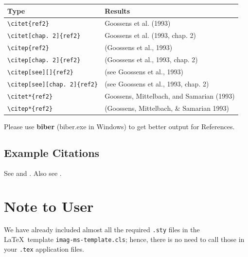 \documentclass[]{imag-ms-template}
\begin{document}
\noindent\begin{tabular}{@{}ll}
\bf Type&\bf Results\\
\midrule
\verb+\citet{ref2}+&Goossens et al. (1993)\\
\verb+\citet[chap. 2]{ref2}+&Goossens et al. (1993, chap. 2)\\
    \verb+\citep{ref2}+	    &   	(Goossens et al., 1993)\\
    \verb+\citep[chap. 2]{ref2}+ 	&    	(Goossens et al., 1993, chap. 2)\\
    \verb+\citep[see][]{ref2}+ 	 &    	(see Goossens et al., 1993)\\
    \verb+\citep[see][chap. 2]{ref2}+ 	&    	(see Goossens et al., 1993, chap. 2)\\
    \verb+\citet*{ref2}+ 	    &    	Goossens, Mittelbach, and Samarian (1993)\\
    \verb+\citep*{ref2}+	    &    	(Goossens, Mittelbach, \& Samarian
    1993) \\
\end{tabular}

\bigskip

 Please use {\bf biber} (biber.exe in Windows) to get
better output for References.

\nocite{*}

\subsection{Example Citations}

See \cite{Einstein1905} and \cite{Goossens1993,Knuth1986}. Also see \cite{Chen2023}.


\section{Note to User}

We have already included almost all the required \texttt{.sty} files in the
\LaTeX\ template \verb!imag-ms-template.cls!; hence, there is no need to call those in
your \texttt{.tex} application files.

%
%
%
%
\end{document}
